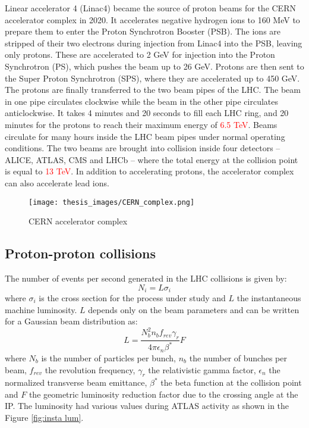 \documentclass[a4paper, oneside, 11pt, openright]{book}
\begin{document}
				Linear accelerator 4 (Linac4) became the source of proton beams for the CERN accelerator complex in 2020. It accelerates negative hydrogen ions to 160 MeV to prepare them to enter the Proton Synchrotron Booster (PSB). The ions are stripped of their two electrons during injection from Linac4 into the PSB, leaving only protons. These are accelerated to 2 GeV for injection into the Proton Synchrotron (PS), which pushes the beam up to 26 GeV. Protons are then sent to the Super Proton Synchrotron (SPS), where they are accelerated up to 450 GeV. The protons are finally transferred to the two beam pipes of the LHC. The beam in one pipe circulates clockwise while the beam in the other pipe circulates anticlockwise. It takes 4 minutes and 20 seconds to fill each LHC ring, and 20 minutes for the protons to reach their maximum energy of \textcolor{red}{6.5 TeV}. Beams circulate for many hours inside the LHC beam pipes under normal operating conditions. The two beams are brought into collision inside four detectors – ALICE, ATLAS, CMS and LHCb – where the total energy at the collision point is equal to \textcolor{red}{13 TeV}. In addition to accelerating protons, the accelerator complex can also accelerate lead ions.
				
				\begin{figure}[H]
					\centering
					\texttt{[image: thesis\_images/CERN\_complex.png]}
					\caption{CERN accelerator complex}
					\label{fig:CERN_complex}
				\end{figure}
			
			\subsection{Proton-proton collisions}
				The number of events per second generated in the LHC collisions is given by:
				$$
				N_{i} = L\sigma_{i}
				$$
				where $\sigma_{i}$ is the cross section for the process under study and $L$ the instantaneous machine luminosity. $L$ depends only on the beam parameters and can be written for a Gaussian beam distribution as: 
				$$
				L = \frac{N_b^2n_bf_{rev}\gamma_r}{4\pi\epsilon_n\beta^*}F
				$$
				where $N_b$ is the number of particles per bunch, $n_b$ the number of bunches per beam, $f_{rev}$ the revolution frequency, $\gamma_r$ the relativistic gamma factor, $\epsilon_n$ the normalized transverse beam emittance, $\beta^*$ the beta function at the collision point and $F$ the geometric luminosity reduction factor due to the crossing angle at the IP. The luminosity had various values during ATLAS activity as shown in the Figure \ref{fig:insta lum}.
				
\end{document}
